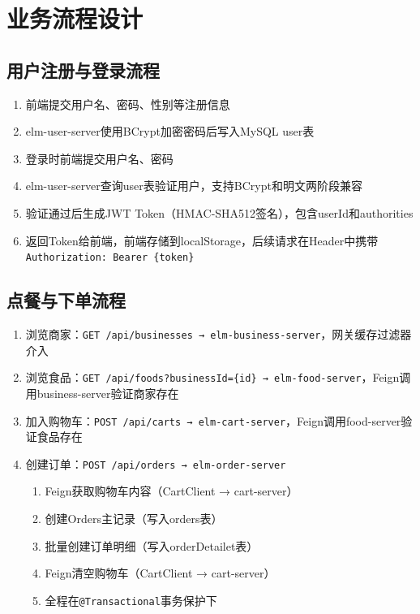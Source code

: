 
\chapter{业务流程设计}

\section{用户注册与登录流程}

\begin{enumerate}
	\item 前端提交用户名、密码、性别等注册信息
	\item elm-user-server使用BCrypt加密密码后写入MySQL user表
	\item 登录时前端提交用户名、密码
	\item elm-user-server查询user表验证用户，支持BCrypt和明文两阶段兼容
	\item 验证通过后生成JWT Token（HMAC-SHA512签名），包含userId和authorities
	\item 返回Token给前端，前端存储到localStorage，后续请求在Header中携带\verb|Authorization: Bearer {token}|
\end{enumerate}

\section{点餐与下单流程}

\begin{enumerate}
	\item 浏览商家：\verb|GET /api/businesses → elm-business-server|，网关缓存过滤器介入
	\item 浏览食品：\verb|GET /api/foods?businessId={id} → elm-food-server|，Feign调用business-server验证商家存在
	\item 加入购物车：\verb|POST /api/carts → elm-cart-server|，Feign调用food-server验证食品存在
	\item 创建订单：\verb|POST /api/orders → elm-order-server|
	\begin{enumerate}
		\item Feign获取购物车内容（CartClient → cart-server）
		\item 创建Orders主记录（写入orders表）
		\item 批量创建订单明细（写入orderDetailet表）
		\item Feign清空购物车（CartClient → cart-server）
		\item 全程在\verb|@Transactional|事务保护下
	\end{enumerate}
\end{enumerate}

